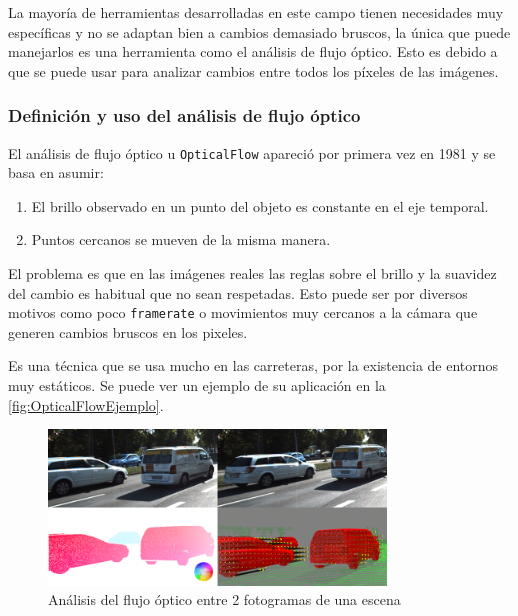 La mayoría de herramientas desarrolladas en este campo tienen necesidades muy específicas y no se adaptan bien a cambios demasiado bruscos, la única que puede manejarlos es una herramienta como el análisis de flujo óptico. 
Esto es debido a que se puede usar para analizar cambios entre todos los píxeles de las imágenes.

\subsubsection{Definición y uso del análisis de flujo óptico}

El análisis de flujo óptico u \texttt{OpticalFlow} apareció por primera vez en 1981\cite{hornDeterminingOpticalFlow1981} y se basa en asumir:

\begin{enumerate}
    \item El brillo observado en un punto del objeto es constante en el eje temporal.
    \item Puntos cercanos se mueven de la misma manera.
\end{enumerate}

El problema es que en las imágenes reales las reglas sobre el brillo y la suavidez del cambio es habitual que no sean respetadas. Esto puede ser por diversos motivos como poco \texttt{framerate} o movimientos 
muy cercanos a la cámara que generen cambios bruscos en los pixeles.

Es una técnica que se usa mucho en las carreteras, por la existencia de entornos muy estáticos. Se puede ver un ejemplo de su aplicación en la \autoref{fig:OpticalFlowEjemplo}.

\begin{figure}[H]
    \centering
    \includegraphics[width=0.8\textwidth]{images/4/OpticalFlow.png}
    \caption{Análisis del flujo óptico entre 2 fotogramas de una escena\cite{schusterCombiningStereoDisparity2018}}
    \label{fig:OpticalFlowEjemplo}
\end{figure}

